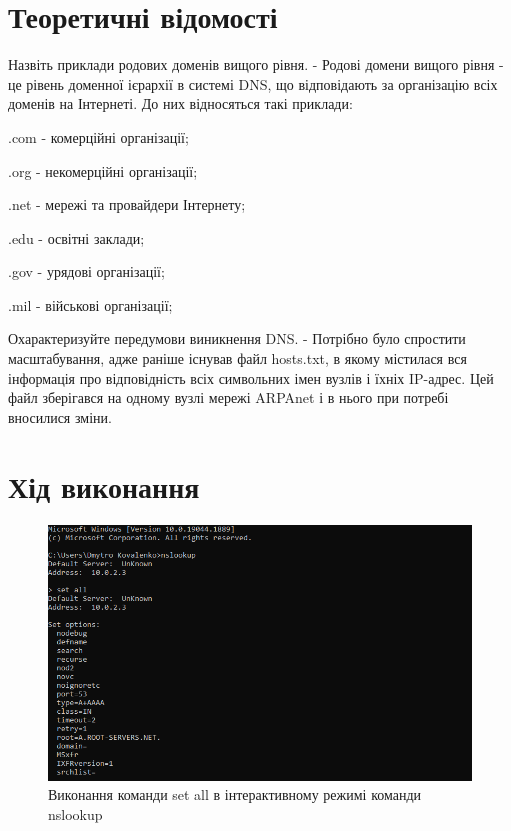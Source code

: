 \documentclass{article}
\begin{document}
\begin{normalsize}
\section*{Теоретичні відомості}
Назвіть приклади родових доменів вищого рівня. - Родові домени вищого рівня - це рівень доменної ієрархії в системі DNS, що відповідають за організацію всіх доменів на Інтернеті. До них відносяться такі приклади:
\begin{list}{}{}
\item .com - комерційні організації;
\item .org - некомерційні організації;
\item .net - мережі та провайдери Інтернету;
\item .edu - освітні заклади;
\item .gov - урядові організації;
\item .mil - військові організації;
\end{list}

Охарактеризуйте передумови виникнення DNS. - Потрібно було спростити масштабування, адже раніше існував файл hosts.txt, в якому містилася вся інформація про відповідність всіх символьних імен вузлів і їхніх IP-адрес. Цей файл зберігався на одному вузлі мережі ARPAnet і в нього при потребі вносилися зміни.

\section*{Хід виконання}

\begin{figure}[H]
	\centering
	\includegraphics[width=\textwidth]{0}
	\caption{Виконання команди set all в інтерактивному режимі команди nslookup}
\end{figure}
 

\end{normalsize}
\end{document}
